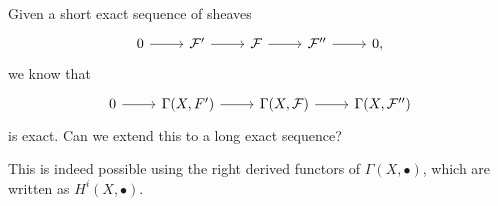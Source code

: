 Given a short exact sequence of sheaves
\[\begin{tikzcd}
0 \arrow[r] & \mathcal{F}' \arrow[r] & \mathcal{F} \arrow[r] & \mathcal{F}'' \arrow[r] & 0,
\end{tikzcd}\]
we know that
\[\begin{tikzcd}
	0\ar[r] & \Gamma(X, F')\ar[r] & \Gamma(X, \mathcal{F})\ar[r] & \Gamma(X, \mathcal{F}'')
\end{tikzcd}\]
is exact. Can we extend this to a long exact sequence?

This is indeed possible using the right derived functors of $\Gamma(X, \bullet)$, which
are written as $H^i(X, \bullet)$.
